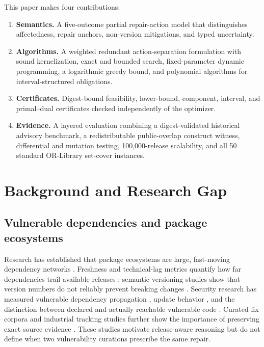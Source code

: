 \documentclass[10pt,conference]{IEEEtran}
\begin{document}
This paper makes four contributions:
\begin{enumerate}
  \item \textbf{Semantics.} A five-outcome partial repair-action model that distinguishes affectedness, repair anchors, non-version mitigations, and typed uncertainty.
  \item \textbf{Algorithms.} A weighted redundant action-separation formulation with sound kernelization, exact and bounded search, fixed-parameter dynamic programming, a logarithmic greedy bound, and polynomial algorithms for interval-structured obligations.
  \item \textbf{Certificates.} Digest-bound feasibility, lower-bound, component, interval, and primal--dual certificates checked independently of the optimizer.
  \item \textbf{Evidence.} A layered evaluation combining a digest-validated historical advisory benchmark, a redistributable public-overlap construct witness, differential and mutation testing, 100,000-release scalability, and all 50 standard OR-Library set-cover instances.
\end{enumerate}

\section{Background and Research Gap}
\subsection{Vulnerable dependencies and package ecosystems}
Research has established that package ecosystems are large, fast-moving dependency networks \cite{kikas2017structure,wittern2016dynamics,decan2017seven}. Freshness and technical-lag metrics quantify how far dependencies trail available releases \cite{cox2015freshness,decan2018lag}; semantic-versioning studies show that version numbers do not reliably prevent breaking changes \cite{raemaekers2014semver}. Security research has measured vulnerable dependency propagation \cite{zimmermann2019npm,zerouali2022impact,liu2022dvgraph,ruohonen2018python}, update behavior \cite{kula2018updates,derr2017updated,lauinger2017depend}, and the distinction between declared and actually reachable vulnerable code \cite{plate2015impact,ponta2018beyond,pashchenko2018counting}. Curated fix corpora and industrial tracking studies further show the importance of preserving exact source evidence \cite{ponta2019dataset,cadariu2015tracking}. These studies motivate release-aware reasoning but do not define when two vulnerability curations prescribe the same repair.
\end{document}
